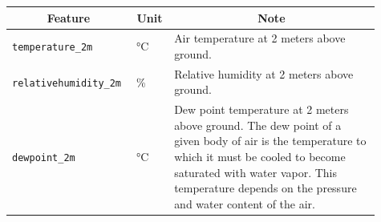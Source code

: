 \begin{longtable}[c]{p{0.3\linewidth}|p{0.07\linewidth}| p{0.54\linewidth}}
	\hline
	\multicolumn{1}{c|}{\textbf{Feature}}                                                                                                                                                   &
	\multicolumn{1}{c|}{\textbf{Unit}}                                                                                                                                                      &
	\multicolumn{1}{c}{\textbf{Note}}                                                                                                                                                                                                                                                                                                                                                                                                                                                                                          \\
	\hline
	\verb|temperature_2m|                                                                                                                                                                   & °C                      & Air temperature at 2 meters above ground.                                                                                                                                                                                                                                                              \\
	\verb|relativehumidity_2m|                                                                                                                                                              & \%                      & Relative humidity at 2 meters above ground.                                                                                                                                                                                                                                                            \\
	\verb|dewpoint_2m|                                                                                                                                                                      & °C                      & Dew point temperature at 2 meters above ground. The dew point of a given body of air is the temperature to which it must be cooled to become saturated with water vapor. This temperature depends on the pressure and water content of the air.                                                        \\ %

\end{longtable}
